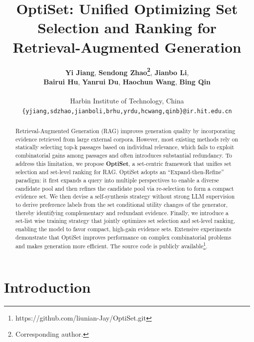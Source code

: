 \documentclass[11pt]{article}
\title{OptiSet: Unified Optimizing Set Selection and Ranking for Retrieval-Augmented Generation}
\author{
 \textbf{Yi Jiang},
 \textbf{Sendong Zhao\thanks{Corresponding author.}},
 \textbf{Jianbo Li},
 \\
 \textbf{Bairui Hu},
 \textbf{Yanrui Du},
 \textbf{Haochun Wang},
 \textbf{Bing Qin}
\\
\\
 Harbin Institute of Technology, China
 \\
  \texttt{
   \{yjiang,sdzhao,jianboli,brhu,yrdu,hcwang,qinb\}@ir.hit.edu.cn
 }
}
\begin{document}
\maketitle

\begin{abstract}
Retrieval-Augmented Generation (RAG) improves generation quality by incorporating evidence retrieved from large external corpora. However, most existing methods rely on statically selecting top-k passages based on individual relevance, which fails to exploit combinatorial gains among passages and often introduces substantial redundancy. 
To address this limitation, we propose \textbf{OptiSet}, a set-centric framework that unifies set selection and set-level ranking for RAG. OptiSet adopts an ``Expand-then-Refine'' paradigm: it first expands a query into multiple perspectives to enable a diverse candidate pool and then refines the candidate pool via re-selection to form a compact evidence set. 
We then devise a self-synthesis strategy without strong LLM supervision to derive preference labels from the set conditional utility changes of the generator, thereby identifying complementary and redundant evidence.
Finally, we introduce a set-list wise training strategy that jointly optimizes set selection and set-level ranking, enabling the model to favor compact, high-gain evidence sets. 
Extensive experiments demonstrate that OptiSet improves performance on complex combinatorial problems and makes generation more efficient. 
The source code is publicly available\footnote{https://github.com/liunian-Jay/OptiSet.git}.
\end{abstract}


\section{Introduction}
\end{document}
